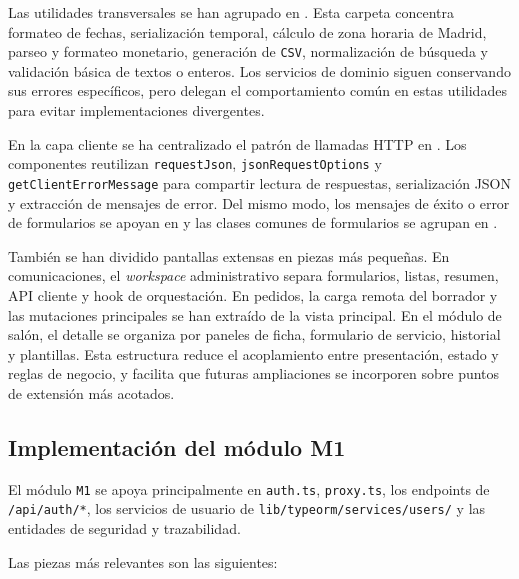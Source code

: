 Las utilidades transversales se han agrupado en . Esta carpeta concentra formateo de fechas, serialización temporal, cálculo de zona horaria de Madrid, parseo y formateo monetario, generación de \texttt{CSV}, normalización de búsqueda y validación básica de textos o enteros. Los servicios de dominio siguen conservando sus errores específicos, pero delegan el comportamiento común en estas utilidades para evitar implementaciones divergentes.

En la capa cliente se ha centralizado el patrón de llamadas HTTP en . Los componentes reutilizan \texttt{requestJson}, \texttt{jsonRequestOptions} y \texttt{getClientErrorMessage} para compartir lectura de respuestas, serialización JSON y extracción de mensajes de error. Del mismo modo, los mensajes de éxito o error de formularios se apoyan en  y las clases comunes de formularios se agrupan en .

También se han dividido pantallas extensas en piezas más pequeñas. En comunicaciones, el \textit{workspace} administrativo separa formularios, listas, resumen, API cliente y hook de orquestación. En pedidos, la carga remota del borrador y las mutaciones principales se han extraído de la vista principal. En el módulo de salón, el detalle se organiza por paneles de ficha, formulario de servicio, historial y plantillas. Esta estructura reduce el acoplamiento entre presentación, estado y reglas de negocio, y facilita que futuras ampliaciones se incorporen sobre puntos de extensión más acotados.



\subsection{Implementación del módulo M1}

El módulo \texttt{M1} se apoya principalmente en \texttt{auth.ts}, \texttt{proxy.ts}, los endpoints de \texttt{/api/auth/*}, los servicios de usuario de \texttt{lib/typeorm/services/users/} y las entidades de seguridad y trazabilidad.

Las piezas más relevantes son las siguientes:

